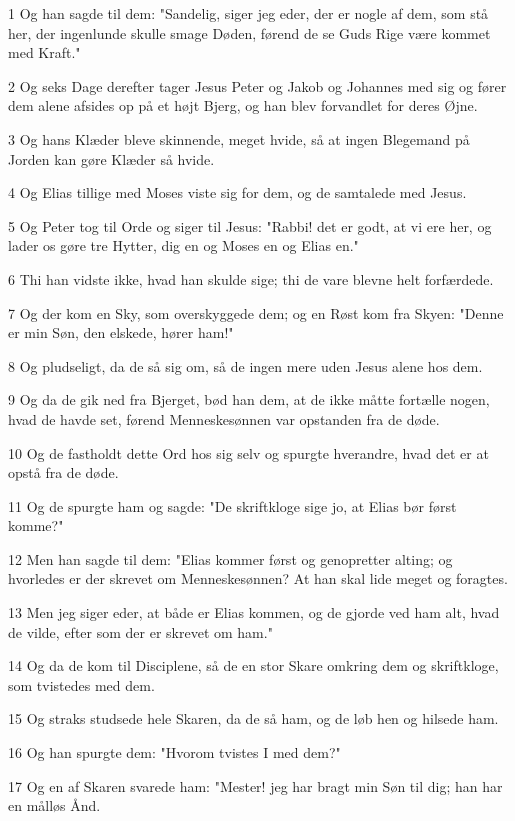 \par 1 Og han sagde til dem: "Sandelig, siger jeg eder, der er nogle af dem, som stå her, der ingenlunde skulle smage Døden, førend de se Guds Rige være kommet med Kraft."
\par 2 Og seks Dage derefter tager Jesus Peter og Jakob og Johannes med sig og fører dem alene afsides op på et højt Bjerg, og han blev forvandlet for deres Øjne.
\par 3 Og hans Klæder bleve skinnende, meget hvide, så at ingen Blegemand på Jorden kan gøre Klæder så hvide.
\par 4 Og Elias tillige med Moses viste sig for dem, og de samtalede med Jesus.
\par 5 Og Peter tog til Orde og siger til Jesus: "Rabbi! det er godt, at vi ere her, og lader os gøre tre Hytter, dig en og Moses en og Elias en."
\par 6 Thi han vidste ikke, hvad han skulde sige; thi de vare blevne helt forfærdede.
\par 7 Og der kom en Sky, som overskyggede dem; og en Røst kom fra Skyen: "Denne er min Søn, den elskede, hører ham!"
\par 8 Og pludseligt, da de så sig om, så de ingen mere uden Jesus alene hos dem.
\par 9 Og da de gik ned fra Bjerget, bød han dem, at de ikke måtte fortælle nogen, hvad de havde set, førend Menneskesønnen var opstanden fra de døde.
\par 10 Og de fastholdt dette Ord hos sig selv og spurgte hverandre, hvad det er at opstå fra de døde.
\par 11 Og de spurgte ham og sagde: "De skriftkloge sige jo, at Elias bør først komme?"
\par 12 Men han sagde til dem: "Elias kommer først og genopretter alting; og hvorledes er der skrevet om Menneskesønnen? At han skal lide meget og foragtes.
\par 13 Men jeg siger eder, at både er Elias kommen, og de gjorde ved ham alt, hvad de vilde, efter som der er skrevet om ham."
\par 14 Og da de kom til Disciplene, så de en stor Skare omkring dem og skriftkloge, som tvistedes med dem.
\par 15 Og straks studsede hele Skaren, da de så ham, og de løb hen og hilsede ham.
\par 16 Og han spurgte dem: "Hvorom tvistes I med dem?"
\par 17 Og en af Skaren svarede ham: "Mester! jeg har bragt min Søn til dig; han har en målløs Ånd.
